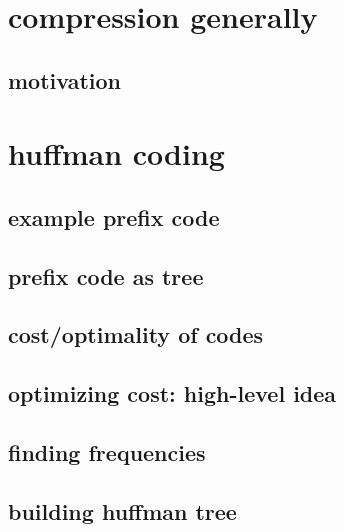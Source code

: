 \section{compression generally} 

\subsection{motivation}



\section{huffman coding}

\subsection{example prefix code}



\subsection{prefix code as tree}



\subsection{cost/optimality of codes}



\subsection{optimizing cost: high-level idea}




\subsection{finding frequencies}




\subsection{building huffman tree}

